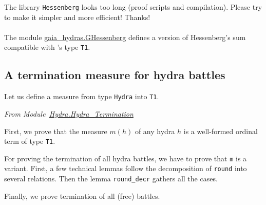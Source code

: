 
    \begin{project}
    The library \texttt{Hessenberg} looks too long (proof scripts and compilation).
    Please try to make it simpler and more efficient!
    Thanks!
    \end{project}


    \paragraph*{\gaiasign} The module
      \href{../theories/html/gaia_hydras.~GHessenberg.html}{gaia\_hydras.GHessenberg} defines a version of Hessenberg's sum
      compatible with \gaia's type \texttt{T1}.
      
    \subsection{A termination measure for hydra battles }

    \label{sec:hydra-measure}

    Let us define a measure from type \texttt{Hydra} into \texttt{T1}.


    \vspace{4pt}
    \emph{From Module~\href{../theories/html/hydras.Hydra.Hydra_Termination.html\#m}{Hydra.Hydra\_Termination}}

   



    First, we prove that the measure $m(h)$  of any hydra $h$ is a well-formed ordinal term of type \texttt{T1}.

    
      
   
    For proving the termination of all hydra battles, we have to prove that
    \texttt{m} is a variant. First, a few technical lemmas follow the decomposition of \texttt{round} into several relations. Then the lemma \texttt{round\_decr} gathers all the cases.

    \label{sect:variant-decr}

    
    
    
    
     
 
      Finally, we prove termination of all (free) battles.

